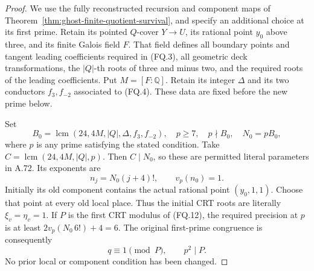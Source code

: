 \begin{proof}
We use the fully reconstructed recursion and component
maps of Theorem~\ref{thm:ghost-finite-quotient-survival},
and specify an additional choice at its first prime.
Retain its pointed \(Q\)-cover
\(Y\to U\), its rational point \(y_0\) above three,
and its finite Galois field \(F\).
That field defines all boundary points and tangent
leading coefficients required in (FQ.3), all geometric
deck transformations, the \(|Q|\)-th roots of three
and minus two, and the required roots of the leading
coefficients. Put \(M=[F:\mathbb Q]\).
Retain its integer \(\Delta\) and its two conductors
\(f_3,f_{-2}\) associated to (FQ.4).
These data are fixed before the new prime below.

Set
\[
 B_0=\operatorname{lcm}(24,4M,|Q|,\Delta,f_3,f_{-2}),
 \quad p\ge7,\quad p\nmid B_0,\quad
 N_0=pB_0,
 \tag{AQ.2}
\]
where \(p\) is any prime satisfying the stated
condition. Take
\(C=\operatorname{lcm}(24,4M,|Q|,p)\).
Then \(C\mid N_0\), so these are permitted literal
parameters in A.72. Its exponents are
\[
 n_j=N_0(j+4)!,\qquad
 v_p(n_0)=1.
 \tag{AQ.3}
\]
Initially its old component contains the actual
rational point \((y_0,1,1)\).
Choose that point at every old local place.
Thus the initial CRT roots are literally
\(\xi_v=\eta_v=1\).
If \(P\) is the first CRT modulus of (FQ.12),
the required precision at \(p\) is at least
\(2v_p(N_0\,6!)+4=6\).
The original first-prime congruence is consequently
\[
 q\equiv1\pmod P,\qquad p^2\mid P.
 \tag{AQ.4}
\]
No prior local or component condition has been changed.


\end{proof}
